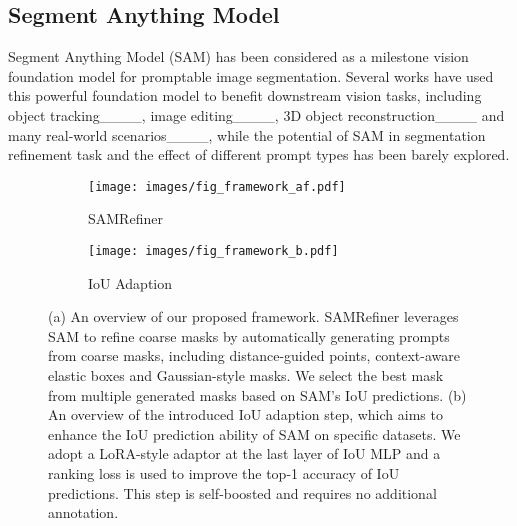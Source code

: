  
\subsection{Segment Anything Model}
Segment Anything Model (SAM) has been considered as a milestone vision foundation model for promptable image segmentation. Several works have used this powerful foundation model to benefit downstream vision tasks, including object tracking____, image editing____, 3D object reconstruction____ and many real-world scenarios____, while the potential of SAM in segmentation refinement task and the effect of different prompt types has been barely explored.












\begin{figure}[tb]%
  \centering
  \begin{subfigure}{0.71\linewidth}
    \texttt{[image: images/fig\_framework\_af.pdf]}
    \caption{SAMRefiner}
    \label{fig:framework-a}
  \end{subfigure}
  \hfill
  \begin{subfigure}{0.26\linewidth}
    \texttt{[image: images/fig\_framework\_b.pdf]}
    \caption{IoU Adaption}
    \label{fig:framework-b}
  \end{subfigure}
  \caption{(a) An overview of our proposed framework. SAMRefiner leverages SAM to refine coarse masks by automatically generating prompts from coarse masks, including distance-guided points, context-aware elastic boxes and Gaussian-style masks. We select the best mask from multiple generated masks based on SAM's IoU predictions. (b) An overview of the introduced IoU adaption step, which aims to enhance the IoU prediction ability of SAM on specific datasets. We adopt a LoRA-style adaptor at the last layer of IoU MLP and a ranking loss is used to improve the top-1 accuracy of IoU predictions. This step is self-boosted and requires no additional annotation.}
  \label{fig:framework overview}
  \vspace{-4mm}
\end{figure}